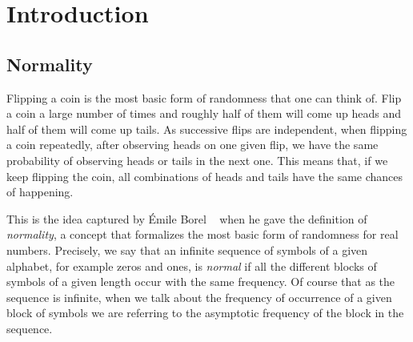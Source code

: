 \documentclass[11pt,a4paper]{tesis}
\theoremstyle{definition}
\begin{document}

\def\autor{Lucas Puterman}
\def\tituloTesis{Números Muy Normales}
\def\runtitulo{Números Muy Normales}
\def\runtitle{Very Normal Numbers}
\def\director{Dra. Verónica Becher}
\def\codirector{Olivier Carton}
\def\lugar{Buenos Aires, 2019}


\frontmatter
\pagestyle{empty}


\cleardoublepage


\cleardoublepage

\cleardoublepage
\tableofcontents

\mainmatter
\pagestyle{headings}


\chapter{Introduction}


\section{Normality}

Flipping a coin is the most basic form of randomness that one can think of. Flip a coin a large number of times and roughly half of them will come up heads and half of them will come up tails.
As successive flips are independent, when flipping a coin repeatedly, after observing heads on one given flip, we have the same probability of observing heads or tails in the next one. This means that, if we keep flipping the coin, all combinations of heads and tails have the same chances of happening.

This is the idea captured by Émile Borel  ~\cite{Borel} when he gave the definition of \textit{normality}, a concept that formalizes  the most basic form of randomness for real numbers. Precisely, we say that an infinite sequence of symbols of a given alphabet, for example zeros and ones, is \textit{normal} if all the different blocks of symbols of a given length occur with the same frequency.
Of course that as the sequence is infinite, when we talk about the frequency of occurrence of a given block of symbols we are referring to the asymptotic frequency of the block in the sequence.
\end{document}
